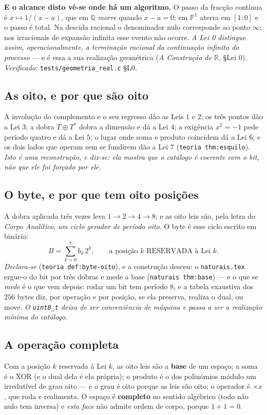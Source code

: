 \documentclass[11pt,a4paper]{article}
\newcommand{\code}[1]{\texttt{\small #1}}
\newcommand{\leitura}[1]{\code{#1}}
\begin{document}
\textbf{E o alcance disto vê-se onde há um algoritmo.} O passo da fracção
contínua é $x\mapsto1/(x-a)$, que em $\mathbb{Q}$ \emph{morre} quando $x-a=0$; em
$\mathbb{P}^1$ aterra em $[1:0]$ e o passo é total. Na descida racional o
denominador nulo corresponde ao ponto $\infty$; nos irracionais de expansão
infinita esse evento não ocorre. \emph{A Lei 0 distingue assim,
operacionalmente, a terminação racional da continuação infinita do processo}
--- e é essa a sua realização geométrica (\emph{A Construção de $\mathbb{R}$},
\S Lei 0). \emph{Verificado:} \code{tests/geometria\_real.c} \S L0.

\subsection*{As oito, e por que são oito}
A involução do complemento e o seu regresso dão as Leis $1$ e $2$; os
três pontos dão a Lei $3$; a dobra $T\oplus T^{*}$ dobra a dimensão e
dá a Lei $4$; a exigência $x^{2}=-1$ pede período quatro e dá a Lei
$5$; o lugar onde soma e produto coincidem dá a Lei $6$; e os dois
lados que operam sem se fundirem dão a Lei $7$
(\leitura{teoria thm:esquilo}). \emph{Isto é uma reconstrução, e diz-se: ela
mostra que o catálogo é coerente com o bit, não que ele foi forçado por
ele.}

\subsection*{O byte, e por que tem oito posições}
A dobra aplicada três vezes leva $1\to2\to4\to8$; e as oito leis são,
pela letra do \emph{Corpo Analítico}, \emph{um ciclo gerador de período
oito}. O byte é esse ciclo escrito em binário:
\[
\boxed{\;B=\sum_{k=0}^{7}b_k\,2^{k},
\qquad \text{a posição }k\text{ RESERVADA à Lei }k.\;}
\]
\emph{Declara-se} (\leitura{teoria def:byte-oito}), e a construção desceu: o \code{naturais.tex} ergue-o do bit por três dobras e mede a base (\code{naturais thm:base}) --- e o que se \emph{mede} é
o que vem depois: rodar um bit tem período $8$, e a tabela exaustiva dos
$256$ bytes diz, por operação e por posição, se ela preserva, realiza o
dual, ou move. \emph{O \code{uint8\_t} deixa de ser conveniência de
máquina e passa a ser a realização mínima do catálogo.}

\subsection*{A operação completa}
Com a posição $k$ reservada à Lei $k$, as oito leis são a \textbf{base} de
um espaço; a soma é o XOR (e o dual dela é ela própria); o produto é o
dos polinómios módulo um irredutível de grau oito --- e o grau é oito
porque as leis são oito; o operador é $\times x$, que roda e realimenta.
O espaço é \textbf{completo} no sentido algébrico (todo não nulo tem
inversa) e \emph{esta face} não admite ordem de corpo, porque $1+1=0$.
\end{document}
